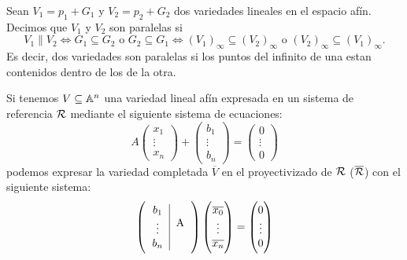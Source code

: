 \begin{obs}
Sean $V_1 = p_1 + G_1$ y $V_2 = p_2 + G_2$ dos variedades lineales en el espacio afín.
Decimos que $V_1$ y $V_2$ son paralelas si
\[
  V_1 \parallel V_2 \iff G_1 \subseteq G_2 \text{ o } G_2 \subseteq G_1 \iff
  (V_1)_\infty \subseteq (V_2)_\infty \text{ o } (V_2)_\infty \subseteq (V_1)_\infty.
\]
Es decir, dos variedades son paralelas si los puntos del infinito de una estan 
contenidos dentro de los de la otra.
\end{obs}

\begin{prop}
 Si tenemos $V \subseteq \mathbb{A}^n$ una variedad lineal afín expresada en un sistema
 de referencia $\mathcal{R}$ mediante el siguiente sistema de ecuaciones:
 \[
   A 
   \begin{pmatrix} x_1 \\ \vdots \\ x_n \end{pmatrix} 
   + 
   \begin{pmatrix}
     b_1 \\ \vdots \\ b_n
   \end{pmatrix}
   =
   \begin{pmatrix}
     0 \\ \vdots \\ 0
   \end{pmatrix}
 \]
 podemos expresar la variedad completada $\overline{V}$ en
 el proyectivizado de $\mathcal{R}$ ($\overline{\mathcal{R}}$) con el siguiente sistema:
  \[
   \lp
   \begin{tabular}{c|c} $b_1$ & \multirow{3}{*}{A} \\ $\vdots$ & \\ $b_n$ & \end{tabular} 
   \rp 
   \begin{pmatrix}
     \overline{x_0} \\ \vdots \\ \overline{x_n} 
   \end{pmatrix}
   =
   \begin{pmatrix}
     0 \\ \vdots \\ 0
   \end{pmatrix}
 \]
 \end{prop}

